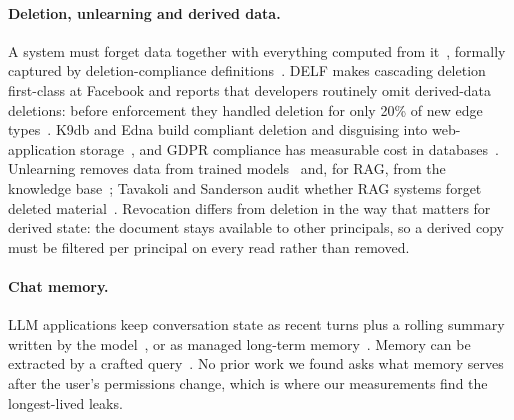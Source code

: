 \paragraph{Deletion, unlearning and derived data.}
A system must forget data together with everything computed from it~\cite{cao2015towards}, formally
captured by deletion-compliance definitions~\cite{garg2020formalizing}. DELF makes cascading deletion
first-class at Facebook and reports that developers routinely omit derived-data deletions: before
enforcement they handled deletion for only 20\% of new edge types~\cite{cohngordon2020delf}. K9db and
Edna build compliant deletion and disguising into web-application storage~\cite{albab2023k9db,tsai2023edna},
and GDPR compliance has measurable cost in databases~\cite{shastri2020gdpr}. Unlearning removes data
from trained models~\cite{bourtoule2021machine} and, for RAG, from the knowledge
base~\cite{wang2024unlearningrag}; Tavakoli and Sanderson audit whether RAG systems forget deleted
material~\cite{tavakoli2026deletion}. Revocation differs from deletion in the way that matters for
derived state: the document stays available to other principals, so a derived copy must be
filtered per principal on every read rather than removed.

\paragraph{Chat memory.}
LLM applications keep conversation state as recent turns plus a rolling summary written by the
model~\cite{wang2023recursively,doc_langchain_summary,doc_llamaindex_memory}, or as managed long-term
memory~\cite{packer2023memgpt,park2023generative,zhong2024memorybank}. Memory can be extracted by a
crafted query~\cite{wang2025mextra}. No prior work we found asks what memory serves after the user's
permissions change, which is where our measurements find the longest-lived leaks.

